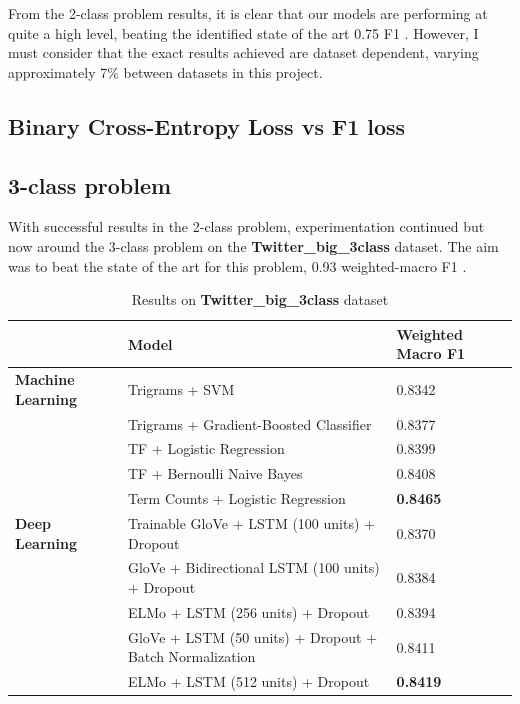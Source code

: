 \documentclass[12pt,a4paper]{article}
\begin{document}
From the 2-class problem results, it is clear that our models are performing at quite a high level, beating the identified state of the art 0.75 F1 \cite{Hack}. However, I must consider that the exact results achieved are dataset dependent, varying approximately 7\% between datasets in this project.

\subsection{Binary Cross-Entropy Loss vs F1 loss}

\subsection{3-class problem}

With successful results in the 2-class problem, experimentation continued but now around the 3-class problem on the \textbf{Twitter\_big\_3class} dataset. The aim was to beat the state of the art for this problem, 0.93 weighted-macro F1 \cite{Badjatiya}. 

\begin{table}[H]
	\centering
	\vspace*{-18pt}
	\caption{Results on \textbf{Twitter\_big\_3class} dataset}
	\label{results4}
	\hspace*{-1.5cm}
	\begin{tabular}{p{3.4cm} p{10.5cm} p{3.8cm}} \hline\hline
		& \textbf{Model} & \textbf{Weighted Macro F1}  \\ \hline
		
     \textbf{Machine Learning} & Trigrams + SVM & 0.8342 \\
	& Trigrams + Gradient-Boosted Classifier & 0.8377 \\
	& TF + Logistic Regression & 0.8399 \\
	& TF + Bernoulli Naive Bayes & 0.8408 \\
	& Term Counts + Logistic Regression & \textbf{0.8465} \\ \hline
	
	\textbf{Deep Learning} & Trainable GloVe + LSTM (100 units) + Dropout & 0.8370  \\  
	& GloVe + Bidirectional LSTM (100 units) + Dropout & 0.8384  \\
	& ELMo + LSTM (256 units) + Dropout & 0.8394  \\
	& GloVe + LSTM (50 units) + Dropout + Batch Normalization & 0.8411 \\ 
	& ELMo + LSTM (512 units) + Dropout & \textbf{0.8419} \\ \hline
	\end{tabular}
\end{table}
\end{document}
